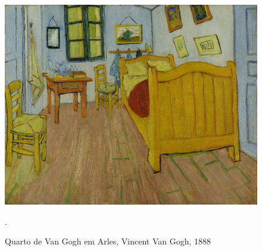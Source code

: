 \documentclass{article}
\begin{document}
\begin{figure}
\centering\includegraphics[height=0.3\textheight,keepaspectratio]
                          {../viagem-a-volta-do-meu-quarto/slaapkamer.jpg}
  \caption{Quarto de Van Gogh em Arles, Vincent Van Gogh, 1888}.
  \label{fig:5}
\end{figure}

\printbibliography[heading=bibliography,title={Bibliografia}]
\end{document}
